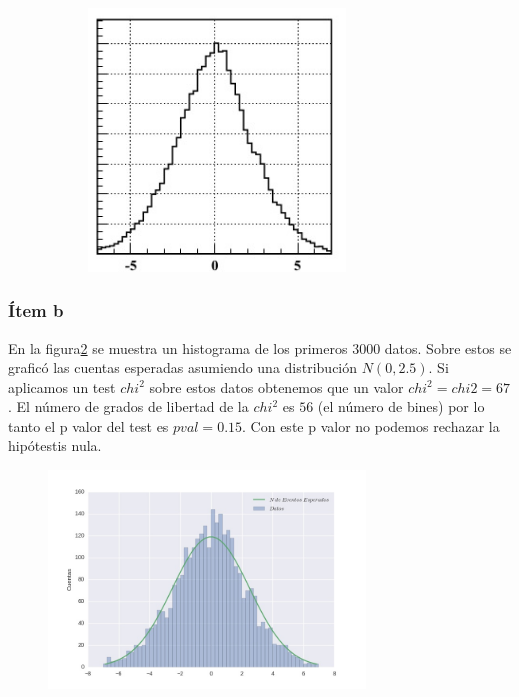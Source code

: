 \begin{figure}
\begin{subfigure}[b]{0.3\textwidth}
\includegraphics[width=0.75\textwidth]{hist1.jpg}
\end{subfigure}
\caption[]{}
\label{fig:hists}
\end{figure}

\subsubsection*{Ítem b}
En la figura\ref{fig:fig2} se muestra un histograma de los primeros $3000$ datos.
Sobre estos se graficó las cuentas esperadas asumiendo una distribución $N(0, 2.5)$.
Si aplicamos un test $chi^2$ sobre estos datos obtenemos que un valor $chi^2 =chi2=67$.
El número de grados de libertad de la $chi^2$ es $56$ (el número de bines) por lo tanto el p valor del test es $pval=0.15$.
Con este p valor no podemos rechazar la hipótestis nula.

\begin{figure}
\centering
\includegraphics[width=0.75\textwidth]{fig2.jpg}
\caption[]{}
\label{fig:fig2}
\end{figure}


